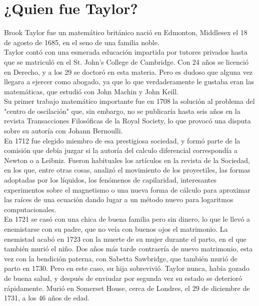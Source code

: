 

\section{¿Quien fue Taylor?}
\label{2:sec:1}
  Brook Taylor fue un matem\'atico brit\'anico naci\'o en Edmonton, Middlesex el 18 de agosto de 1685, en el seno de una familia noble.\\
Taylor cont\'o con una esmerada educaci\'on impartida por tutores privados hasta que se matricul\'o en el St. John's College de Cambridge. Con 24 a\~nos se licenci\'o en Derecho, y a los 29 se doctor\'o en esta materia. Pero es dudoso que alguna vez llegara a ejercer como abogado, ya que lo que verdaderamente le gustaba eran las matem\'aticas, que estudi\'o con John Machin y John Keill.\\
Su primer trabajo matem\'atico importante fue en 1708 la soluci\'on al problema del "centro de oscilaci\'on" que, sin embargo, no se publicar\'ia hasta seis a\~nos en la revista Transacciones Filos\'oficas de la Royal Society, lo que provoc\'o una disputa sobre su autor\'ia con Johann Bernoulli.\\
En 1712 fue elegido miembro de esa prestigiosa sociedad, y form\'o parte de la comisi\'on que deb\'ia juzgar si la autor\'ia del calculo diferencial correspond\'ia a Newton o a Leibniz. Fueron habituales los art\'iculos en la revista de la Sociedad, en los que, entre otras cosas, analiz\'o el movimiento de los proyectiles, las formas adoptadas por los l\'iquidos, los fen\'omenos de capilaridad, interesantes experimentos sobre el magnetismo o una nueva forma de c\'alculo para aproximar las ra\'ices de una ecuaci\'on dando lugar a un m\'etodo nuevo para logaritmos computacionales.\\
En 1721 se cas\'o con una chica de buena familia pero sin dinero, lo que le llev\'o a enemistarse con su padre, que no ve\'ia con buenos ojos el matrimonio. La enemistad acab\'o en 1723 con la muerte de su mujer durante el parto, en el que tambi\'en muri\'o el ni\~no. Dos a\~nos m\'as tarde contraer\'ia de nuevo matrimonio, esta vez con la bendici\'on paterna, con Sabetta Sawbridge, que tambi\'en muri\'o de parto en 1730. Pero en este caso, su hija sobrevivi\'o.
Taylor nunca, hab\'ia gozado de buena salud, y despu\'es de enviudar por segunda vez su estado se deterior\'o r\'apidamente. Muri\'o en Somerset House, cerca de Londres, el 29 de diciembre de 1731, a los 46 a\~nos de edad.

